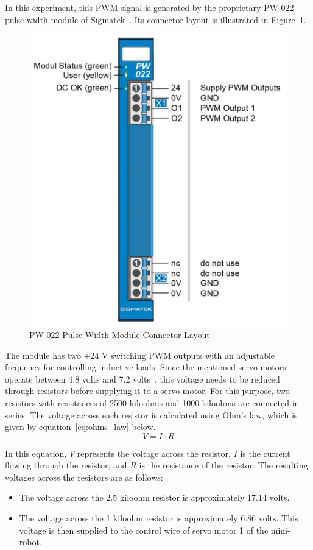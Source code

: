 \documentclass[MMR,Master,english]{twbook}
\begin{document}
\noindent In this experiment, this PWM signal is generated by the proprietary PW 022 pulse width module of Sigmatek~\cite{DigitalOutputSIGMATEK}. Its connector layout is illustrated in Figure~\ref{fig:pw022_connectors}.

\begin{figure}[H]
	\centering
	\includegraphics[width=0.5\columnwidth]{img/experiment/pw022_connectors.png}
	\caption[PW 022 Pulse Width Module Connector Layout]{PW 022 Pulse Width Module Connector Layout~\cite{DigitalOutputSIGMATEK}}
	\label{fig:pw022_connectors}
\end{figure}

\noindent The module has two +24 V switching PWM outputs with an adjustable frequency for controlling inductive loads. Since the mentioned servo motors operate between 4.8 volts and 7.2 volts~\cite{MG996RServoMotor}, this voltage needs to be reduced through resistors before supplying it to a servo motor. For this purpose, two resistors with resistances of 2500 kiloohms and 1000 kiloohms are connected in series. The voltage across each resistor is calculated using Ohm's law, which is given by equation~\ref{eq:ohms_law} below.
\begin{equation}
	\label{eq:ohms_law}
	V = I \cdot R
\end{equation}

\noindent In this equation, \(V\) represents the voltage across the resistor, \(I\) is the current flowing through the resistor, and \(R\) is the resistance of the resistor. The resulting voltages across the resistors are as follows:

\begin{itemize}
	\item The voltage across the 2.5 kiloohm resistor is approximately 17.14 volts.
	\item The voltage across the 1 kiloohm resistor is approximately 6.86 volts. This voltage is then supplied to the control wire of servo motor 1 of the mini-robot.
\end{itemize}
\end{document}
